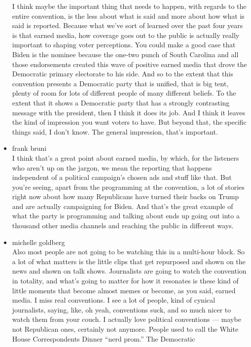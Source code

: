\begin{itemize}
  I think maybe the important thing that needs to happen, with regards
  to the entire convention, is the less about what is said and more
  about how what is said is reported. Because what we've sort of learned
  over the past four years is that earned media, how coverage goes out
  to the public is actually really important to shaping voter
  perceptions. You could make a good case that Biden is the nominee
  because the one-two punch of South Carolina and all those endorsements
  created this wave of positive earned media that drove the Democratic
  primary electorate to his side. And so to the extent that this
  convention presents a Democratic party that is unified, that is big
  tent, plenty of room for lots of different people of many different
  beliefs. To the extent that it shows a Democratic party that has a
  strongly contrasting message with the president, then I think it does
  its job. And I think it leaves the kind of impression you want voters
  to have. But beyond that, the specific things said, I don't know. The
  general impression, that's important.
\item
  frank bruni\\
  I think that's a great point about earned media, by which, for the
  listeners who aren't up on the jargon, we mean the reporting that
  happens independent of a political campaign's chosen ads and stuff
  like that. But you're seeing, apart from the programming at the
  convention, a lot of stories right now about how many Republicans have
  turned their backs on Trump and are actually campaigning for Biden.
  And that's the great example of what the party is programming and
  talking about ends up going out into a thousand other media channels
  and reaching the public in different ways.
\item
  michelle goldberg\\
  Also most people are not going to be watching this in a multi-hour
  block. So a lot of what matters is the little clips that get
  repurposed and shown on the news and shown on talk shows. Journalists
  are going to watch the convention in totality, and what's going to
  matter for how it resonates is these kind of little moments that
  become almost memes or become, as you said, earned media. I miss real
  conventions. I see a lot of people, kind of cynical journalists,
  saying, like, oh yeah, conventions suck, and so much nicer to watch
  them from your couch. I actually love political conventions --- maybe
  not Republican ones, certainly not anymore. People used to call the
  White House Correspondents Dinner ``nerd prom.'' The Democratic

\end{itemize}
